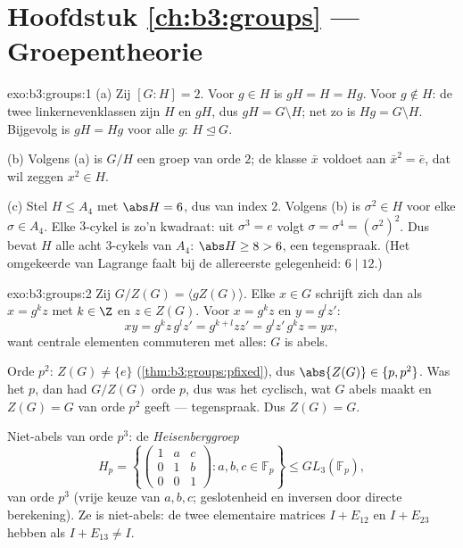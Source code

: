 \section*{Hoofdstuk \ref{ch:b3:groups} --- Groepentheorie}

\begin{solution}{exo:b3:groups:1}
(a) Zij $[G:H] = 2$. Voor $g \in H$ is $gH = H = Hg$. Voor $g
\notin H$: de twee linkernevenklassen zijn $H$ en $gH$, dus $gH = G
\setminus H$; net zo is $Hg = G \setminus H$. Bijgevolg is $gH =
Hg$ voor alle $g$: $H \trianglelefteq G$.

(b) Volgens (a) is $G/H$ een groep van orde $2$; de klasse $\bar x$
voldoet aan $\bar x^2 = \bar e$, dat wil zeggen $x^2 \in H$.

(c) Stel $H \leq A_4$ met $\abs H = 6$, dus van index $2$. Volgens
(b) is $\sigma^2 \in H$ voor elke $\sigma \in A_4$. Elke $3$-cykel
is zo'n kwadraat: uit $\sigma^3 = e$ volgt $\sigma = \sigma^4 =
(\sigma^2)^2$. Dus bevat $H$ alle acht $3$-cykels van $A_4$: $\abs
H \geq 8 > 6$, een tegenspraak. (Het omgekeerde van Lagrange faalt
bij de allereerste gelegenheid: $6 \mid 12$.)
\end{solution}

\begin{solution}{exo:b3:groups:2}
Zij $G/Z(G) = \langle gZ(G) \rangle$. Elke $x \in G$ schrijft zich
dan als $x = g^k z$ met $k \in \Z$ en $z \in Z(G)$. Voor $x = g^kz$
en $y = g^l z'$:
\[
xy = g^k z\, g^l z' = g^{k+l} z z' = g^l z'\, g^k z = yx,
\]
want centrale elementen commuteren met alles: $G$ is abels.

Orde $p^2$: $Z(G) \neq \{e\}$ (\cref{thm:b3:groups:pfixed}), dus
$\abs{Z(G)} \in \{p, p^2\}$. Was het $p$, dan had $G/Z(G)$ orde
$p$, dus was het cyclisch, wat $G$ abels maakt en $Z(G) = G$ van
orde $p^2$ geeft --- tegenspraak. Dus $Z(G) = G$.

Niet-abels van orde $p^3$: de \emph{Heisenberggroep}
\[
H_p = \left\{ \begin{pmatrix} 1 & a & c\\ 0 & 1 & b\\ 0 & 0 & 1
\end{pmatrix} : a, b, c \in \mathbb F_p \right\}
\leq GL_3(\mathbb F_p),
\]
van orde $p^3$ (vrije keuze van $a, b, c$; geslotenheid en inversen
door directe berekening). Ze is niet-abels: de twee elementaire
matrices $I + E_{12}$ en $I + E_{23}$ hebben als  $I +
E_{13} \neq I$.
\end{solution}

